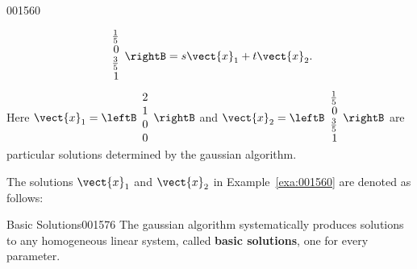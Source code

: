\begin{example}{}{001560}
\begin{solution}
\begin{equation*}
\begin{array}{r}
		\frac{1}{5} \\
		0 \\
		\frac{3}{5} \\
		1 
	\end{array} \rightB
	= s\vect{x}_1 + t\vect{x}_2.
\end{equation*}
Here $\vect{x}_1 =
\leftB \begin{array}{r}
	2 \\
	1 \\
	0 \\
	0
\end{array} \rightB$ and $\vect{x}_2 =
\leftB \begin{array}{r}
	\frac{1}{5} \\
 	0 \\
 	\frac{3}{5} \\
 	1 
\end{array} \rightB$ are particular solutions determined by the gaussian algorithm.
\end{solution}
\end{example}

\noindent The solutions $\vect{x}_1$ and $\vect{x}_2$ in Example~\ref{exa:001560} are denoted as follows:

\begin{definition}{Basic Solutions}{001576}
The gaussian algorithm systematically produces solutions to any homogeneous linear system, called \textbf{basic solutions}, one for every parameter.
\end{definition}

